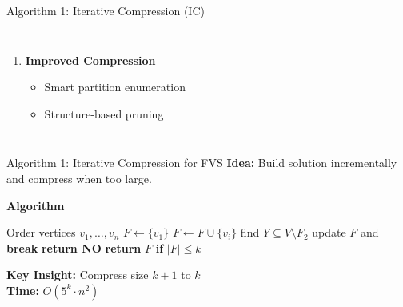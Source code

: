 \documentclass[aspectratio=169]{beamer}
\begin{document}
\begin{frame}{Algorithm 1: Iterative Compression (IC)}
\begin{columns}[T]
\begin{enumerate}
			\item \textbf{Improved Compression}
			      \begin{itemize}
				      \scriptsize
				      \item Smart partition enumeration
				      \item Structure-based pruning
			      \end{itemize}
		\end{enumerate}

	\end{columns}
\end{frame}

\begin{frame}{Algorithm 1: Iterative Compression for FVS}
\scriptsize
\textbf{Idea:} Build solution incrementally and compress when too large.

\textbf{Algorithm}
\begin{algorithmic}[1]
  \State Order vertices $v_1,\dots,v_n$
  \State $F \gets \{v_1\}$
    \State $F \gets F \cup \{v_i\}$
        \State find $Y \subseteq V \setminus F_2$
          \State update $F$ and \textbf{break}
        \EndIf
      \EndFor
        \State \textbf{return NO}
      \EndIf
    \EndIf
  \EndFor
  \State \textbf{return} $F$ \textbf{if} $|F| \le k$
\end{algorithmic}

\textbf{Key Insight:} Compress size $k\!+\!1$ to $k$ \\
\textbf{Time:} $O(5^k \cdot n^2)$
\end{frame}
\end{document}
